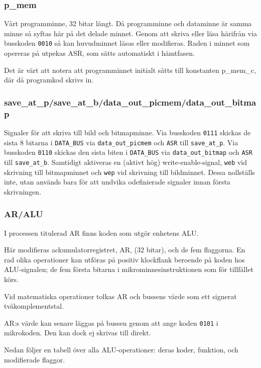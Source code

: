 \documentclass[]{article}
\begin{document}
\subsubsection{p\_mem}

Vårt programminne, 32 bitar långt. Då programminne och dataminne är samma minne så syftas här på det delade minnet. Genom att skriva eller läsa härifrån via busskoden \texttt{0010} så kan huvudminnet läsas eller modifieras. Raden i minnet som opereras på utpekas ASR, som sätts automatiskt i hämtfasen.

Det är värt att notera att programminnet initialt sätts till konstanten p\_mem\_c, där då programkod skrivs in.

\subsubsection{save\_at\_p/save\_at\_b/data\_out\_picmem/data\_out\_bitmap}

Signaler för att skriva till bild och bitmapminne. Via busskoden \texttt{0111} skickas de sista 8 bitarna i \texttt{DATA\_BUS} via \texttt{data\_out\_picmem} och \texttt{ASR} till \texttt{save\_at\_p}. Via busskoden \texttt{0110} skickas den sista biten i \texttt{DATA\_BUS} via \texttt{data\_out\_bitmap} och \texttt{ASR} till \texttt{save\_at\_b}. Samtidigt aktiveras en (aktivt hög) write-enable-signal, \texttt{web} vid skrivning till bitmapminnet och \texttt{wep} vid skrivning till bildminnet. Dessa nollställs inte, utan används bara för att undvika odefinierade signaler innan första skrivningen.

\subsubsection{AR/ALU}

I processen titulerad AR finns koden som utgör enhetens ALU.

Här modifieras ackumulatorregistret, AR, (32 bitar), och de fem flaggorna. En rad olika operationer kan utföras på positiv klockflank beroende på koden hos ALU-signalen; de fem första bitarna i mikrominnesinstruktionen som för tillfället körs.

Vid matematiska operationer tolkas AR och bussens värde som ett signerat tvåkomplementstal.

AR:s värde kan senare läggas på bussen genom att ange koden \texttt{0101} i mikrokoden. Den kan dock ej skrivas till direkt.

Nedan följer en tabell över alla ALU-operationer: deras koder, funktion, och modifierade flaggor.
\\
\end{document}
